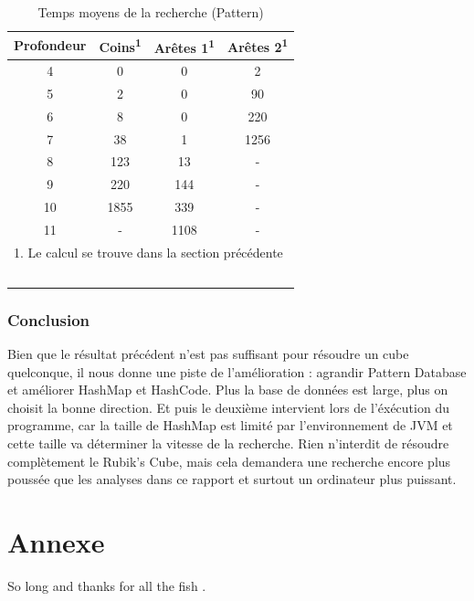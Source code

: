 \documentclass[fleqn,10pt,french]{SelfArx} %
\begin{document}
\begin{table}[htbp]
\centering
\begin{tabular}{cccc}
\hline
\rowcolor{blue!20} \rule{0pt}{12pt} \textbf{Profondeur} & \textbf{Coins\textsuperscript{1} } & \textbf{Arêtes 1}\textsuperscript{1} & \textbf{Arêtes 2\textsuperscript{1}}\\
\hline
4 & 0 & 0 & 2 \\
5 & 2 & 0 & 90 \\
6 & 8 & 0 & 220  \\
7 & 38 & 1 & 1256 \\
8 & 123 & 13 & - \\
9 & 220 & 144 & - \\
10 & 1855 & 339 & - \\
11 & - & 1108 & - \\
\hline
\multicolumn{4}{l}{\small{1. Le calcul se trouve dans la section précédente}} \\
\hline
~\\
\end{tabular}
\caption{Temps moyens de la recherche (Pattern)}
\end{table}

\subsubsection{Conclusion}

Bien que le résultat précédent n’est pas suffisant pour résoudre un cube quelconque, il nous donne une piste de l’amélioration : agrandir Pattern Database et améliorer HashMap et HashCode. Plus la base de données est large, plus on choisit la bonne direction. Et puis le deuxième intervient lors de l’éxécution du programme, car la taille de HashMap est limité par l’environnement de JVM et cette taille va déterminer la vitesse de la recherche. Rien n’interdit de résoudre complètement le Rubik’s Cube, mais cela demandera une recherche encore plus poussée que les analyses dans ce rapport et surtout un ordinateur plus puissant.

\section*{Annexe} %


So long and thanks for all the fish \cite{Figueredo:2009dg}.
\end{document}
